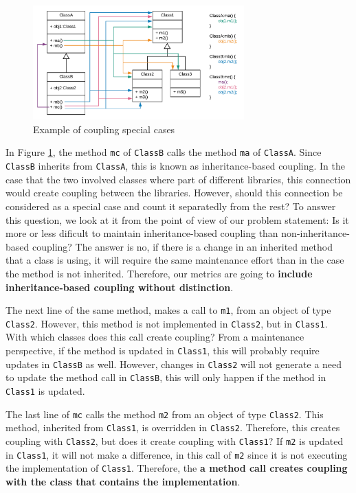 \documentclass[a4paper]{article}
\begin{document}
\begin{figure}[ht]
\begin{center}
\includegraphics[height=4.4cm]{img/specialcases.png}
\caption{Example of coupling special cases}
\label{fig:specialcases}
\end{center}
\end{figure}

In Figure \ref{fig:specialcases}, the method \texttt{mc} of \texttt{ClassB} calls the method \texttt{ma} of \texttt{ClassA}. Since \texttt{ClassB} inherits from \texttt{ClassA}, this is known as inheritance-based coupling. In the case that the two involved classes where part of different libraries, this connection would create coupling between the libraries. However, should this connection be considered as a special case and count it separatedly from the rest? To answer this question, we look at it from the point of view of our problem statement: Is it more or less dificult to maintain inheritance-based coupling than non-inheritance-based coupling? The answer is no, if there is a change in an inherited method that a class is using, it will require the same maintenance effort than in the case the method is not inherited. Therefore, our metrics are going to \textbf{include inheritance-based coupling without distinction}.

The next line of the same method, makes a call to \texttt{m1}, from an object of type \texttt{Class2}. However, this method is not implemented in \texttt{Class2}, but in \texttt{Class1}. With which classes does this call create coupling? From a maintenance perspective, if the method is updated in \texttt{Class1}, this will probably require updates in \texttt{ClassB} as well. However, changes in \texttt{Class2} will not generate a need to update the method call in \texttt{ClassB}, this will only happen if the method in \texttt{Class1} is updated.

The last line of \texttt{mc} calls the method \texttt{m2} from an object of type \texttt{Class2}. This method, inherited from \texttt{Class1}, is overridden in \texttt{Class2}. Therefore, this creates coupling with \texttt{Class2}, but does it create coupling with \texttt{Class1}? If  \texttt{m2} is updated in \texttt{Class1}, it will not make a difference, in this call of \texttt{m2} since it is not executing the implementation of \texttt{Class1}. Therefore, the \textbf{a method call creates coupling with the class that contains the implementation}.
\end{document}
